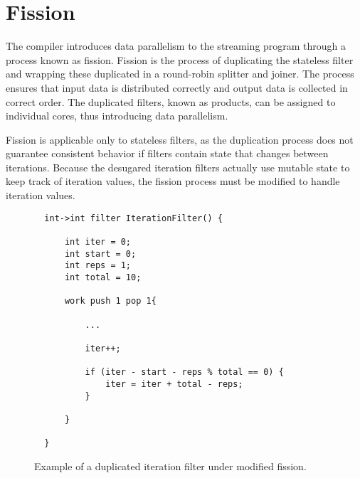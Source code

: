 \section{Fission}

The compiler introduces data parallelism to the streaming program through a process known as fission.  Fission is the process of duplicating the stateless filter and wrapping these duplicated in a round-robin splitter and joiner.  The process ensures that input data is distributed correctly and output data is collected in correct order.  The duplicated filters, known as products, can be assigned to individual cores, thus introducing data parallelism.  

Fission is applicable only to stateless filters, as the duplication process does not guarantee consistent behavior if filters contain state that changes between iterations.  Because the desugared iteration filters actually use mutable state to keep track of iteration values, the fission process must be modified to handle iteration values.  

\begin{figure}[t]
{\eightpoint
\begin{verbatim}
  int->int filter IterationFilter() {

      int iter = 0;
      int start = 0;
      int reps = 1;
      int total = 10;

      work push 1 pop 1{

          ...

          iter++;

          if (iter - start - reps % total == 0) {
              iter = iter + total - reps;
          }

      }

  }
\end{verbatim}
\caption{Example of a duplicated iteration filter under modified fission.\protect\label{fig:modified-fission-filter-example}}}
\end{figure}


